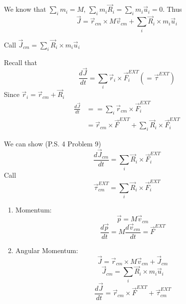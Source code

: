 We know that $\sum_i m_i = M$, $\sum_i m_i\vec{R}_i = \sum_i m_i \vec{u}_i = 0$. Thus
\[\vec{J} = \vec{r}_{cm} \times M\vec{v}_{cm} + \sum_i\vec{R}_i\times m_i\vec{u}_i\]

Call $\vec{J}_{cm} = \sum_i \vec{R}_i \times m_i\vec{u}_i$

Recall that 
\[\frac{d\vec{J}}{dt} = \sum_i \vec{r}_i \times \vec{F}_i^{EXT} (= \vec{\tau}^{EXT})\]
Since $\vec{r}_i = \vec{r}_{cm} + \vec{R}_i$
\[\begin{aligned} \frac{d\vec{J}}{dt} &= = \sum_i \vec{r}_{cm} \times \vec{F}_i^{EXT}\\
&= \vec{r}_{cm} \times \vec{F}^{EXT} + \sum_i\vec{R}_i\times\vec{F}_i^{EXT}
\end{aligned}
\]

We can show (P.S. 4 Problem 9)
\[\frac{d\vec{J}_{cm}}{dt} = \sum_i\vec{R}_i\times\vec{F}_i^{EXT}\]
Call
\[\vec{\tau}_{cm}^{EXT} = \sum_i\vec{R}_i \times \vec{F}_i^{EXT}\]

\begin{enumerate}
\item Momentum: \[\vec{p} = M\vec{v}_{cm}\]
\[\frac{d\vec{p}}{dt} =  M\frac{d\vec{v}_{cm}}{dt} = \vec{F}^{EXT}\]
\item Angular Momentum: \[\vec{J} = \vec{r}_{cm} \times M\vec{v}_{cm} + \vec{J}_{cm}\]
\[\vec{J}_{cm} = \sum_i\vec{R}_i \times m_i\vec{u}_i\]
\[\frac{d\vec{J}}{dt} = \vec{r}_{cm} \times \vec{F}^{EXT} + \vec{\tau}_{cm}^{EXT}\]
\end{enumerate}




















